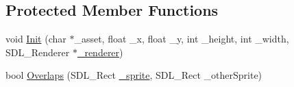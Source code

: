 \subsection*{Protected Member Functions}
\begin{DoxyCompactItemize}
\item 
void \hyperlink{class_x_d_l___sprite_a30ef3609e3bb1a36dea1d6bf3d5628f4}{Init} (char $\ast$\-\_\-asset, float \-\_\-x, float \-\_\-y, int \-\_\-height, int \-\_\-width, S\-D\-L\-\_\-\-Renderer $\ast$\hyperlink{class_x_d_l___sprite_aedcf07ef73df095eb6cd9843870cd002}{\-\_\-renderer})
\item 
bool \hyperlink{class_x_d_l___sprite_a1a4190bbf746275d20dd872e019858c6}{Overlaps} (S\-D\-L\-\_\-\-Rect \hyperlink{_level1_8cpp_a42cdb9591a5fc8edad0b224f0e77a1ec}{\-\_\-sprite}, S\-D\-L\-\_\-\-Rect \-\_\-other\-Sprite)
\end{DoxyCompactItemize}
